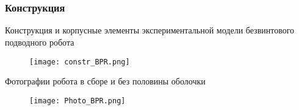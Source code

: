 

\section{}

\begin{frame}
	\begin{center}
		\Huge
	\end{center}
\end{frame}

\begin{frame}
\frametitle{Конструкция}
Конструкция и корпусные элементы экспериментальной модели безвинтового подводного робота
\begin{figure}[h]
	\centering
	\texttt{[image: constr\_BPR.png]}%
\end{figure}
Фотографии робота в сборе и без половины оболочки
\begin{figure}[h]
	\centering
	\texttt{[image: Photo\_BPR.png]}%
\end{figure}

\end{frame}


